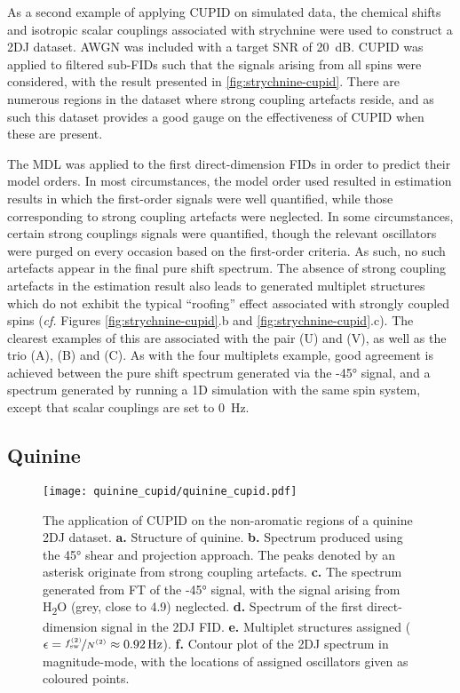 As a second example of applying \ac{CUPID} on simulated data, the chemical
shifts and isotropic scalar couplings associated with strychnine
were used to construct a 2DJ dataset. \ac{AWGN} was included with a target
\ac{SNR} of \qty{20}{\deci\bel}. CUPID was applied to filtered
sub-FIDs such that the signals arising from all spins were considered, with the
result presented in \cref{fig:strychnine-cupid}. There are numerous
regions in the dataset where strong coupling artefacts reside, and as such this
dataset provides a good gauge on the effectiveness of \ac{CUPID} when these are
present.

The \ac{MDL} was applied to the first direct-dimension \acp{FID} in order to
predict their model orders. In most circumstances, the model order used resulted
in estimation results in which the first-order signals were well
quantified, while those corresponding to strong coupling artefacts were neglected.
In some circumstances, certain strong couplings signals were quantified, though
the relevant oscillators were purged on every occasion based on the first-order
criteria. As such, no such artefacts appear in the final pure shift spectrum.
The absence of strong coupling artefacts in the estimation result also leads to
generated multiplet structures which do not exhibit the typical ``roofing''
effect associated with strongly coupled spins (\textit{cf.} Figures
\ref{fig:strychnine-cupid}.b and \ref{fig:strychnine-cupid}.c). The clearest
examples of this are associated with the pair (U) and (V), as well as the trio (A),
(B) and (C). As with the four multiplets example, good agreement is achieved
between the pure shift spectrum generated via the \ang{-45} signal, and a
spectrum generated by running a \ac{1D} simulation with the same spin system,
except that scalar couplings are set to \qty{0}{\hertz}.

\subsection{Quinine}
\begin{figure}
    \centering
    \texttt{[image: quinine\_cupid/quinine\_cupid.pdf]}
    \caption[
        The application of \acs{CUPID} on a quinine \acs{2DJ} dataset.
    ]{
        The application of \ac{CUPID} on the non-aromatic regions of a quinine
        \ac{2DJ} dataset.
        \textbf{a.} Structure of quinine.
        \textbf{b.} Spectrum produced using the \ang{45} shear and projection
        approach. The peaks denoted by an asterisk originate from strong
        coupling artefacts.
        \textbf{c.} The spectrum generated from \ac{FT} of the \ang{-45}
        signal, with the signal arising from H\textsubscript{2}O (grey, close
        to \qty{4.9}{\partspermillion}) neglected.
        \textbf{d.} Spectrum of the first direct-dimension signal in the
        \ac{2DJ} \ac{FID}.
        \textbf{e.} Multiplet structures assigned ($\epsilon =
        \nicefrac{\fswtwo}{\Ntwo} \approx \qty{0.92}{\hertz}$).
        \textbf{f.} Contour plot of the \ac{2DJ} spectrum in magnitude-mode,
        with the locations of assigned oscillators given as coloured points.
    }
    \label{fig:quinine-cupid}
\end{figure}

